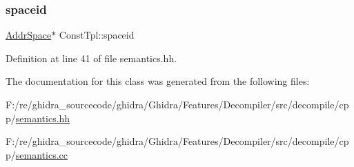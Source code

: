 \mbox{\label{class_const_tpl_ab679aeb151fea96970f9ef8fe2b41359}} 
\subsubsection{\texorpdfstring{spaceid}{spaceid}}
{\footnotesize\ttfamily \mbox{\hyperlink{class_addr_space}{Addr\+Space}}$\ast$ Const\+Tpl\+::spaceid}



Definition at line 41 of file semantics.\+hh.



The documentation for this class was generated from the following files\+:\begin{DoxyCompactItemize}
\item 
F\+:/re/ghidra\+\_\+sourcecode/ghidra/\+Ghidra/\+Features/\+Decompiler/src/decompile/cpp/\mbox{\hyperlink{semantics_8hh}{semantics.\+hh}}\item 
F\+:/re/ghidra\+\_\+sourcecode/ghidra/\+Ghidra/\+Features/\+Decompiler/src/decompile/cpp/\mbox{\hyperlink{semantics_8cc}{semantics.\+cc}}\end{DoxyCompactItemize}
